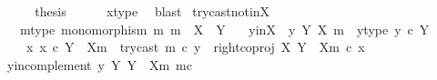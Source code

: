 \begin{isabellebody}
\ \ \isamarkupfalse%
\ \isamarkupfalse%
\ {\isacharquery}{\kern0pt}thesis\isanewline
\ \ \ \ \isamarkupfalse%
\ x{\isacharunderscore}{\kern0pt}type\ \isamarkupfalse%
\ blast\isanewline
{}\isamarkupfalse%
%
\endisatagproof
{\isafoldproof}%
%
\isadelimproof
\isanewline
%
\endisadelimproof
\isanewline
{}\isamarkupfalse%
\ try{\isacharunderscore}{\kern0pt}cast{\isacharunderscore}{\kern0pt}not{\isacharunderscore}{\kern0pt}in{\isacharunderscore}{\kern0pt}X{\isacharcolon}{\kern0pt}\isanewline
\ \ \ m{\isacharunderscore}{\kern0pt}type{\isacharcolon}{\kern0pt}\ {\isachardoublequoteopen}monomorphism\ m{\isachardoublequoteclose}\ {\isachardoublequoteopen}m\ {\isacharcolon}{\kern0pt}\ X\ {\isasymrightarrow}\ Y{\isachardoublequoteclose}\isanewline
\ \ \ y{\isacharunderscore}{\kern0pt}in{\isacharunderscore}{\kern0pt}X{\isacharcolon}{\kern0pt}\ {\isachardoublequoteopen}{\isasymnot}\ y\ {\isasymin}\isactrlbsub Y\isactrlesub \ {\isacharparenleft}{\kern0pt}X{\isacharcomma}{\kern0pt}\ m{\isacharparenright}{\kern0pt}{\isachardoublequoteclose}\ \ y{\isacharunderscore}{\kern0pt}type{\isacharcolon}{\kern0pt}\ {\isachardoublequoteopen}y\ {\isasymin}\isactrlsub c\ Y{\isachardoublequoteclose}\ \ \isanewline
\ \ \ {\isachardoublequoteopen}{\isasymexists}\ x{\isachardot}{\kern0pt}\ x\ {\isasymin}\isactrlsub c\ Y\ {\isasymsetminus}\ {\isacharparenleft}{\kern0pt}X{\isacharcomma}{\kern0pt}m{\isacharparenright}{\kern0pt}\ {\isasymand}\ try{\isacharunderscore}{\kern0pt}cast\ m\ {\isasymcirc}\isactrlsub c\ y\ {\isacharequal}{\kern0pt}\ right{\isacharunderscore}{\kern0pt}coproj\ X\ {\isacharparenleft}{\kern0pt}Y\ {\isasymsetminus}\ {\isacharparenleft}{\kern0pt}X{\isacharcomma}{\kern0pt}m{\isacharparenright}{\kern0pt}{\isacharparenright}{\kern0pt}\ {\isasymcirc}\isactrlsub c\ x{\isachardoublequoteclose}\isanewline
%
\isadelimproof
%
\endisadelimproof
%
\isatagproof
{}\isamarkupfalse%
\ {\isacharminus}{\kern0pt}\isanewline
\ \ \isamarkupfalse%
\ y{\isacharunderscore}{\kern0pt}in{\isacharunderscore}{\kern0pt}complement{\isacharcolon}{\kern0pt}\ {\isachardoublequoteopen}y\ {\isasymin}\isactrlbsub Y\isactrlesub \ {\isacharparenleft}{\kern0pt}Y\ {\isasymsetminus}\ {\isacharparenleft}{\kern0pt}X{\isacharcomma}{\kern0pt}m{\isacharparenright}{\kern0pt}{\isacharcomma}{\kern0pt}\ m\isactrlsup c{\isacharparenright}{\kern0pt}{\isachardoublequoteclose}\isanewline
\ \ \ \ \isamarkupfalse%

\end{isabellebody}
